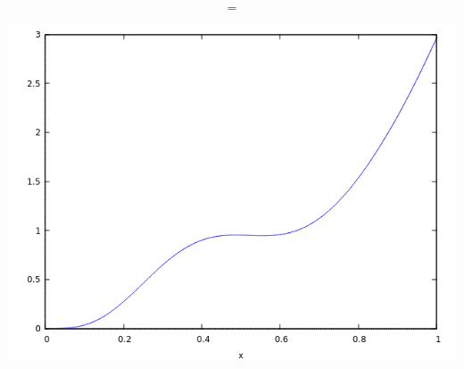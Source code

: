 \documentclass{beamer}
\begin{document}
\begin{frame}[fragile]
\begin{columns}
\end{columns}

$$=$$

\begin{center}\includegraphics[scale=0.2]{images/Beta_mixed_4_6_3_0_c_0_5_alpha.png}\end{center}

\end{frame}
\end{document}
